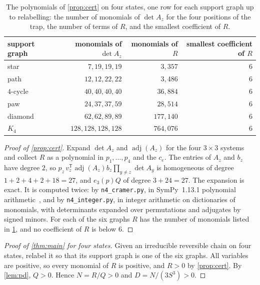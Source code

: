 \documentclass[11pt,a4paper]{article}
\numberwithin{equation}{section}
\theoremstyle{remark}
\begin{document}
\begin{table}[ht]
\centering
\begin{tabular}{lrrr}
\toprule
support graph & monomials of $\det A_z$ & monomials of $R$ & smallest coefficient of $R$\\
\midrule
star & $7,19,19,19$ & $3{,}357$ & $6$\\
path & $12,12,22,22$ & $3{,}486$ & $6$\\
$4$-cycle & $40,40,40,40$ & $36{,}884$ & $6$\\
paw & $24,37,37,59$ & $28{,}514$ & $6$\\
diamond & $62,62,89,89$ & $177{,}140$ & $6$\\
$K_4$ & $128,128,128,128$ & $764{,}076$ & $6$\\
\bottomrule
\end{tabular}
\caption{The polynomials of \cref{prop:cert} on four states, one row for each support graph up to relabelling: the number of monomials of $\det A_z$ for the four positions of the trap, the number of terms of $R$, and the smallest coefficient of $R$.}\label{tab:cert}
\end{table}

\begin{proof}[Proof of \cref{prop:cert}]
Expand $\det A_z$ and $\operatorname{adj}(A_z)$ for the four $3\times3$ systems and collect $R$ as a polynomial in $p_1,\dots,p_4$ and the $c_e$. The entries of $A_z$ and $b_z$ have degree $2$, so $p_z\,v_z^{\mathsf T}\operatorname{adj}(A_z)b_z\prod_{y\ne z}\det A_y$ is homogeneous of degree $1+2+4+2+18=27$, and $e_3(p)Q$ of degree $3+24=27$. The expansion is exact. It is computed twice: by \texttt{n4\_cramer.py}, in SymPy~1.13.1 polynomial arithmetic~\cite{SymPy}, and by \texttt{n4\_integer.py}, in integer arithmetic on dictionaries of monomials, with determinants expanded over permutations and adjugates by signed minors. For each of the six graphs $R$ has the number of monomials listed in \cref{tab:cert}, and no coefficient of $R$ is below $6$.
\end{proof}

\begin{proof}[Proof of \cref{thm:main} for four states]
Given an irreducible reversible chain on four states, relabel it so that its support graph is one of the six graphs. All variables are positive, so every monomial of $R$ is positive, and $R>0$ by \cref{prop:cert}. By \cref{lem:pd}, $Q>0$. Hence $N=R/Q>0$ and $D=N/(3S^3)>0$.
\end{proof}
\end{document}
